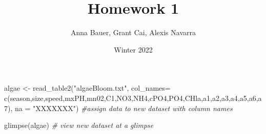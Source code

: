 \documentclass[
]{article}
\title{Homework 1}
\author{Anna Bauer, Grant Cai, Alexis Navarra}
\date{Winter 2022}
\newenvironment{Shaded}{\begin{snugshade}}{\end{snugshade}}
\newcommand{\AttributeTok}[1]{\textcolor[rgb]{0.77,0.63,0.00}{#1}}
\newcommand{\CommentTok}[1]{\textcolor[rgb]{0.56,0.35,0.01}{\textit{#1}}}
\newcommand{\FunctionTok}[1]{\textcolor[rgb]{0.00,0.00,0.00}{#1}}
\newcommand{\NormalTok}[1]{#1}
\newcommand{\OtherTok}[1]{\textcolor[rgb]{0.56,0.35,0.01}{#1}}
\newcommand{\StringTok}[1]{\textcolor[rgb]{0.31,0.60,0.02}{#1}}
\begin{document}
\maketitle

\begin{Shaded}
\begin{Highlighting}[]
\NormalTok{algae }\OtherTok{\textless{}{-}} \FunctionTok{read\_table2}\NormalTok{(}\StringTok{"algaeBloom.txt"}\NormalTok{, }\AttributeTok{col\_names=} \FunctionTok{c}\NormalTok{(}\StringTok{\textquotesingle{}season\textquotesingle{}}\NormalTok{,}\StringTok{\textquotesingle{}size\textquotesingle{}}\NormalTok{,}\StringTok{\textquotesingle{}speed\textquotesingle{}}\NormalTok{,}\StringTok{\textquotesingle{}mxPH\textquotesingle{}}\NormalTok{,}\StringTok{\textquotesingle{}mn02\textquotesingle{}}\NormalTok{,}\StringTok{\textquotesingle{}C1\textquotesingle{}}\NormalTok{,}\StringTok{\textquotesingle{}NO3\textquotesingle{}}\NormalTok{,}\StringTok{\textquotesingle{}NH4\textquotesingle{}}\NormalTok{,}\StringTok{\textquotesingle{}cPO4\textquotesingle{}}\NormalTok{,}\StringTok{\textquotesingle{}PO4\textquotesingle{}}\NormalTok{,}\StringTok{\textquotesingle{}CHla\textquotesingle{}}\NormalTok{,}\StringTok{\textquotesingle{}a1\textquotesingle{}}\NormalTok{,}\StringTok{\textquotesingle{}a2\textquotesingle{}}\NormalTok{,}\StringTok{\textquotesingle{}a3\textquotesingle{}}\NormalTok{,}\StringTok{\textquotesingle{}a4\textquotesingle{}}\NormalTok{,}\StringTok{\textquotesingle{}a5\textquotesingle{}}\NormalTok{,}\StringTok{\textquotesingle{}a6\textquotesingle{}}\NormalTok{,}\StringTok{\textquotesingle{}a7\textquotesingle{}}\NormalTok{), }\AttributeTok{na =} \StringTok{"XXXXXXX"}\NormalTok{) }\CommentTok{\#assign data to new dataset with column names}

\FunctionTok{glimpse}\NormalTok{(algae) }\CommentTok{\# view new dataset at a glimpse}
\end{Highlighting}
\end{Shaded}
\end{document}
